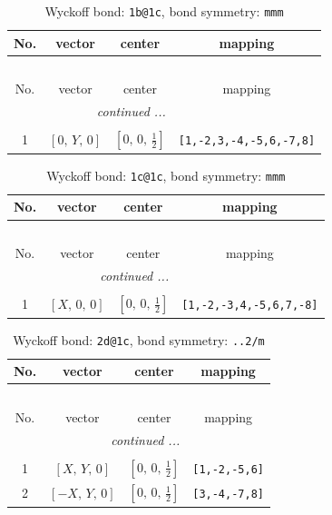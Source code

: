\documentclass[fleqn,8pt]{jsarticle}
\begin{document}
\renewcommand{\arraystretch}{1.2}
\begin{longtable}{cccc}
\caption{Wyckoff bond: {\tt 1b@1c}, bond symmetry: {\tt mmm}}
 \\
 \hline \hline
No. & vector & center & mapping \\ \hline \endfirsthead

\multicolumn{3}{l}{\tablename\ \thetable{}} \\
 \hline \hline
No. & vector & center & mapping \\ \hline \endhead

 \hline \hline
\multicolumn{3}{r}{\footnotesize\it continued ...} \\ \endfoot

 \hline \hline
\multicolumn{3}{r}{} \\ \endlastfoot

1 & $\left[ 0,\, Y,\, 0 \right]$ & $\left[ 0,\, 0,\, \frac{1}{2} \right]$ & {\tt [1,-2,3,-4,-5,6,-7,8]} \\
\end{longtable}
\renewcommand{\arraystretch}{1.2}
\begin{longtable}{cccc}
\caption{Wyckoff bond: {\tt 1c@1c}, bond symmetry: {\tt mmm}}
 \\
 \hline \hline
No. & vector & center & mapping \\ \hline \endfirsthead

\multicolumn{3}{l}{\tablename\ \thetable{}} \\
 \hline \hline
No. & vector & center & mapping \\ \hline \endhead

 \hline \hline
\multicolumn{3}{r}{\footnotesize\it continued ...} \\ \endfoot

 \hline \hline
\multicolumn{3}{r}{} \\ \endlastfoot

1 & $\left[ X,\, 0,\, 0 \right]$ & $\left[ 0,\, 0,\, \frac{1}{2} \right]$ & {\tt [1,-2,-3,4,-5,6,7,-8]} \\
\end{longtable}
\renewcommand{\arraystretch}{1.2}
\begin{longtable}{cccc}
\caption{Wyckoff bond: {\tt 2d@1c}, bond symmetry: {\tt ..2/m}}
 \\
 \hline \hline
No. & vector & center & mapping \\ \hline \endfirsthead

\multicolumn{3}{l}{\tablename\ \thetable{}} \\
 \hline \hline
No. & vector & center & mapping \\ \hline \endhead

 \hline \hline
\multicolumn{3}{r}{\footnotesize\it continued ...} \\ \endfoot

 \hline \hline
\multicolumn{3}{r}{} \\ \endlastfoot

1 & $\left[ X,\, Y,\, 0 \right]$ & $\left[ 0,\, 0,\, \frac{1}{2} \right]$ & {\tt [1,-2,-5,6]} \\ \hline
2 & $\left[ - X,\, Y,\, 0 \right]$ & $\left[ 0,\, 0,\, \frac{1}{2} \right]$ & {\tt [3,-4,-7,8]} \\
\end{longtable}
\end{document}
